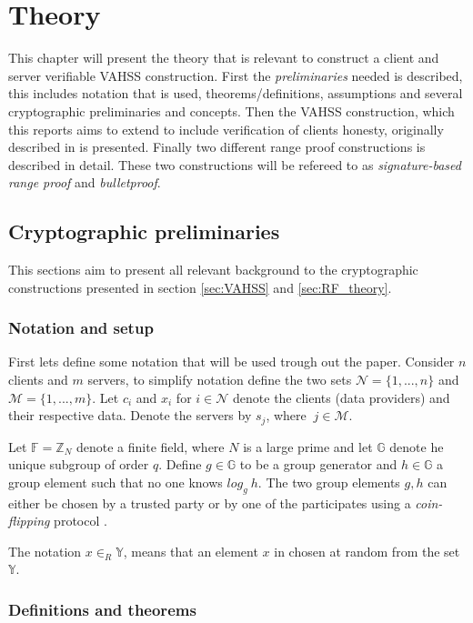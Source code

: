 \chapter{Theory}
This chapter will present the theory that is relevant to construct a client and server verifiable VAHSS construction.  First the \textit{preliminaries} needed is described, this includes notation that is used, theorems/definitions, assumptions and several cryptographic preliminaries and  concepts. Then the VAHSS construction, which this reports aims to extend to include verification of clients honesty, originally described in \cite{SumItUp,VAHSS} is presented.  Finally two different range proof constructions is described in detail. These two constructions will be refereed to as \textit{signature-based range proof} and \textit{bulletproof}. 


\section{Cryptographic preliminaries}
This sections aim to present all relevant background to the cryptographic constructions presented in section \ref{sec:VAHSS} and \ref{sec:RF_theory}. 
\subsection*{Notation and setup}
First lets define some notation that will be used trough out the paper.
Consider $n$ clients and $m$ servers, to simplify notation define the two sets $\mathcal{N}=\{1,...,n\}$ and $\mathcal{M} = \{1,...,m\}$. Let $c_i$ and $x_i$ for $i\in\mathcal{N}$ denote the clients (data providers) and their respective data. Denote the servers by $s_j$, where $\:j\in\mathcal{M}$.


Let $\mathds{F}=\mathds{Z}_N$ denote a finite field, where $N$ is a large prime and let $\mathds{G}$ denote he unique subgroup of order $q$.  Define $g\in\mathds{G}$ to be a group generator and $h\in\mathds{G}$ a group element such that no one knows $log_g\:h$. The two group elements $g,h$ can either be chosen by a trusted party or by one of the participates using a \textit{coin-flipping} protocol \cite{pedersen}.

The notation $x\in_R\mathds{Y}$, means that an element $x$ in chosen at random from the set $\mathds{Y}$.

\subsection*{Definitions and theorems}

